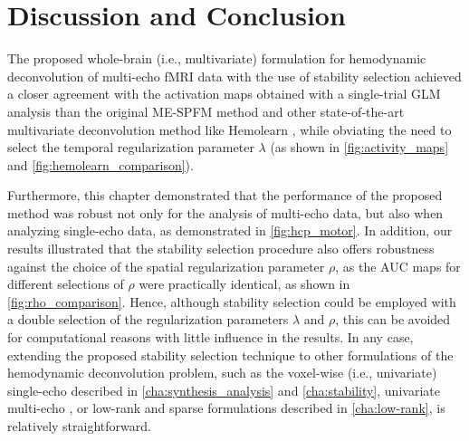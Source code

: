 \section{Discussion and Conclusion}
\label{sec:multivariate_discussion}

The proposed whole-brain (i.e., multivariate) formulation for hemodynamic
deconvolution of multi-echo fMRI data with the use of stability selection
achieved a closer agreement with the activation maps obtained with a
single-trial GLM analysis than the original ME-SPFM method
\citep{CaballeroGaudes2019deconvolutionalgorithmmulti} and other
state-of-the-art multivariate deconvolution method like Hemolearn
\citep{Cherkaoui2021Multivariatesemiblind}, while obviating the need to select
the temporal regularization parameter $\lambda$ (as shown in
\cref{fig:activity_maps} and \cref{fig:hemolearn_comparison}). 

Furthermore, this chapter demonstrated that the performance of the proposed
method was robust not only for the analysis of multi-echo data, but also when
analyzing single-echo data, as demonstrated in \cref{fig:hcp_motor}. In
addition, our results illustrated that the stability selection procedure also
offers robustness against the choice of the spatial regularization parameter
$\rho$, as the AUC maps for different selections of $\rho$ were practically
identical, as shown in \cref{fig:rho_comparison}. Hence, although stability
selection could be employed with a double selection of the regularization
parameters $\lambda$ and $\rho$, this can be avoided for computational reasons
with little influence in the results. In any case, extending the proposed
stability selection technique to other formulations of the hemodynamic
deconvolution problem, such as the voxel-wise (i.e., univariate) single-echo
\citep{Gaudes2013Paradigmfreemapping,Urunuela2020StabilityBasedSparse} described
in \cref{cha:synthesis_analysis} and \cref{cha:stability}, univariate multi-echo
\citep{CaballeroGaudes2019deconvolutionalgorithmmulti}, or low-rank and sparse
formulations
\citep{Urunuela2021LowRankSparse,Cherkaoui2021Multivariatesemiblind} described
in \cref{cha:low-rank}, is relatively straightforward.

